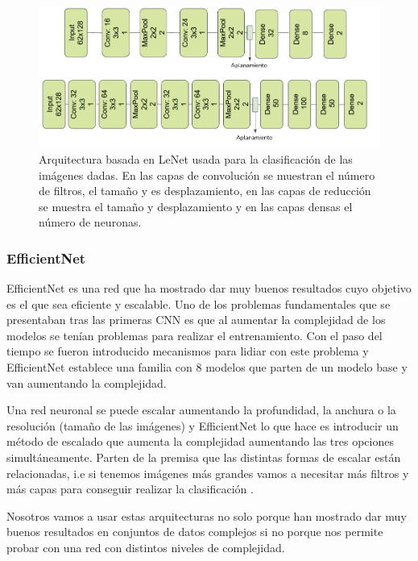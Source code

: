 \documentclass[a4paper,12pt,twoside,titlepage]{article}
\begin{document}
\begin{figure}[h!]
  \centering
  \includegraphics[scale=0.85, center]{lenet.PNG}
  \caption{Arquitectura basada en LeNet usada para la clasificación de las imágenes dadas. En las capas de convolución se muestran el número de filtros, el tamaño y es desplazamiento, en las capas de reducción se muestra el tamaño y desplazamiento y en las capas densas el número de neuronas.}
  \label{fig:lenet}
\end{figure}

\subsubsection*{EfficientNet}

EfficientNet \cite{enet} es una red que ha mostrado dar muy buenos resultados cuyo objetivo es el que sea eficiente y escalable. Uno de los problemas fundamentales que se presentaban tras las primeras CNN es que al aumentar la complejidad de los modelos se tenían problemas para realizar el entrenamiento. Con el paso del tiempo se fueron introducido mecanismos para lidiar con este problema y EfficientNet establece una familia con 8 modelos que parten de un modelo base y van aumentando la complejidad.

Una red neuronal se puede escalar aumentando la profundidad, la anchura o la resolución (tamaño de las imágenes) y EfficientNet lo que hace es introducir un método de escalado que aumenta la complejidad aumentando las tres opciones simultáneamente. Parten de la premisa que las distintas formas de escalar están relacionadas, i.e si tenemos imágenes más grandes vamos a necesitar más filtros y más capas para conseguir realizar la clasificación \cite{enet}.


Nosotros vamos a usar estas arquitecturas no solo porque han mostrado dar muy buenos resultados en conjuntos de datos complejos si no porque nos permite probar con una red con distintos niveles de complejidad. 
\end{document}
